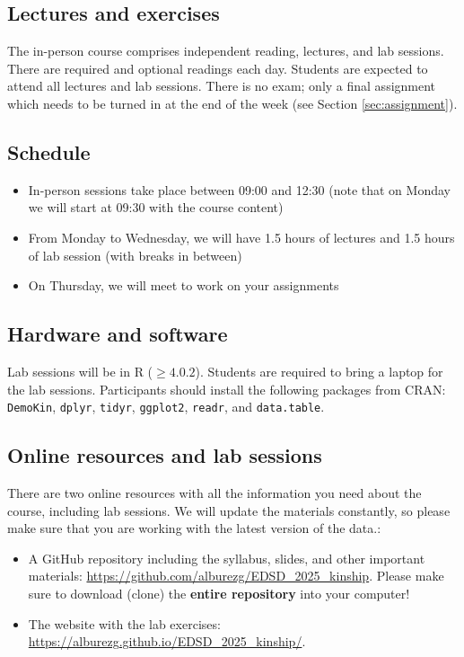 ﻿\documentclass{article}
\begin{document}
\subsection{Lectures and exercises}

The in-person course comprises independent reading, lectures, and lab sessions. There are required and optional readings each day. Students are expected to attend all lectures and lab sessions. There is no exam; only a final assignment which needs to be turned in at the end of the week (see Section \ref{sec:assignment}).  

\subsection*{Schedule}

\begin{itemize}
    \item In-person sessions take place between 09:00 and 12:30 (note that on Monday we will start at 09:30 with the course content)
    \item From Monday to Wednesday, we will have 1.5 hours of lectures and 1.5 hours of lab session (with breaks in between)
    \item On Thursday, we will meet to work on your assignments 
\end{itemize}

\subsection{Hardware and software}

Lab sessions will be in R ($\geq4.0.2$). 
Students are required to bring a laptop for the lab sessions. 
Participants should install the following packages from CRAN: \texttt{DemoKin}, \texttt{dplyr}, \texttt{tidyr}, \texttt{ggplot2}, \texttt{readr}, and \texttt{data.table}.

\subsection{Online resources and lab sessions}

There are two online resources with all the information you need about the course, including lab sessions. We will update the materials constantly, so please make sure that you are working with the latest version of the data.:

\begin{itemize}
    \item A GitHub repository including the syllabus, slides, and other important materials: \url{https://github.com/alburezg/EDSD_2025_kinship}. Please make sure to download (clone) the \textbf{entire repository} into your computer!
    \item The website with the lab exercises: \url{https://alburezg.github.io/EDSD_2025_kinship/}.
\end{itemize}
\end{document}
